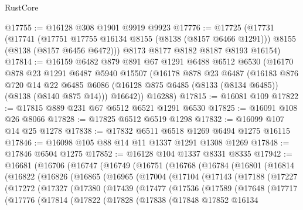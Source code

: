 \begin{lexlean}{RustCore}
\begin{coremodule}
@17755 := @16128 @308 @1901 @9919 @9923
@17776 := @17725
    (@17731
      (@17741
        (@17751 @17755 @16134 @8155 (@8138 (@8157 @6466 @1291)))
        @8155
        (@8138 (@8157 @6456 @6472)))
      @8173
      @8177
      @8182
      @8187
      @8193
      @16154)
@17814 := @16159
    @6482
    @879
    @891
    @67
    @1291
    @6488
    @6512
    @6530
    (@16170
      @878
      @23
      @1291
      @6487
      @5940
      @15507
      (@16178
        @878
        @23
        @6487
        (@16183
          @876
          @720
          @14
          @22
          @6485
          @6086
          (@16128 @875 @6485 (@8133 (@8134 @6485)) (@8138 (@8140 @875 @14)))
          @16642))
      @16288)
@17815 := @16081 @109
@17822 := @17815 @889 @231 @67 @6512 @6521 @1291 @6530
@17825 := @16091 @108 @26 @8066
@17828 := @17825 @6512 @6519 @1298
@17832 := @16099 @107 @14 @25 @1278
@17838 := @17832 @6511 @6518 @1269 @6494 @1275 @16115
@17846 := @16098 @105 @88 @14 @11 @1337 @1291 @1308 @1269
@17848 := @17846 @6504 @1275
@17852 := @16128 @104 @1337 @8331 @8335
@17942 := @16681
    (@16706
      (@16747
        (@16749
          (@16751
            (@16768
              (@16784
                (@16801
                  (@16814
                    (@16822
                      (@16826
                        (@16865
                          (@16965
                            (@17004
                              (@17104
                                (@17143
                                  (@17188
                                    (@17227
                                      (@17272
                                        (@17327
                                          (@17380
                                            (@17439
                                              (@17477
                                                (@17536
                                                  (@17589
                                                    (@17648
                                                      (@17717
                                                        (@17776
                                                          (@17814
                                                            (@17822
                                                              (@17828
                                                                (@17838
                                                                  (@17848
                                                                    @17852
                                                                    @16134

\end{coremodule}
\end{lexlean}

